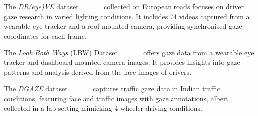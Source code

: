 The \textit{DR(eye)VE }dataset ____ collected on European roads focuses on driver gaze research in varied lighting conditions. It includes 74 videos captured from a wearable eye tracker and a roof-mounted camera, providing synchronised gaze coordinates for each frame.

The \textit{Look Both Ways} (LBW) Dataset ____ offers gaze data from a wearable eye tracker and dashboard-mounted camera images. It provides insights into gaze patterns and analysis derived from the face images of drivers.

The \textit{DGAZE} dataset ____ captures traffic gaze data in Indian traffic conditions, featuring face and traffic images with gaze annotations, albeit collected in a lab setting mimicking 4-wheeler driving conditions.